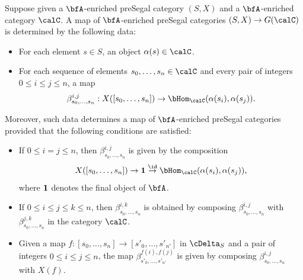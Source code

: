 \begin{remark}\label{makemr}
Suppose given a $\bfA$-enriched preSegal category $(S,X)$ and a $\bfA$-enriched category
$\calC$. A map of $\bfA$-enriched preSegal categories $(S,X) \rightarrow G(\calC)$ is
determined by the following data:
\begin{itemize}
\item For each element $s \in S$, an object $\alpha(s) \in \calC$.
\item For each sequence of elements $s_0, \ldots, s_n \in \calC$ and every pair of integers
$0 \leq i \leq j \leq n$, a map
$$ \beta^{i,j}_{s_0, \ldots, s_n}: X( [s_0, \ldots, s_n] ) \rightarrow \bHom_{\calC}( \alpha(s_i), \alpha(s_j) ).$$
\end{itemize}
Moreover, such data determines a map of $\bfA$-enriched preSegal categories provided that the following conditions are satisfied:
\begin{itemize}
\item If $0 \leq i = j \leq n$, then $\beta^{i,j}_{s_0, \ldots, s_n}$ is given by the composition
$$ X( [s_0, \ldots, s_n] ) \rightarrow {\bf 1} \stackrel{\id}{\rightarrow} \bHom_{\calC}( \alpha(s_i), \alpha(s_j) ),$$
where ${\bf 1}$ denotes the final object of $\bfA$.
\item If $0 \leq i \leq j \leq k \leq n$, then $\beta^{i,k}_{s_0, \ldots, s_n}$ is obtained by composing
$\beta^{i,j}_{s_0, \ldots, s_n}$ with $\beta^{j,k}_{s_0, \ldots, s_n}$ in the category $\calC$.
\item Given a map $f: [s_0, \ldots, s_n] \rightarrow [s'_0, \ldots, s'_{n'} ]$ in $\cDelta_{S}$ and
a pair of integers $0 \leq i \leq j \leq n$, the map $\beta^{ f(i), f(j)}_{ s'_0, \ldots, s'_{n'} }$ is given
by composing $\beta^{i,j}_{s_0, \ldots, s_n}$ with $X(f)$.
\end{itemize}
\end{remark}


